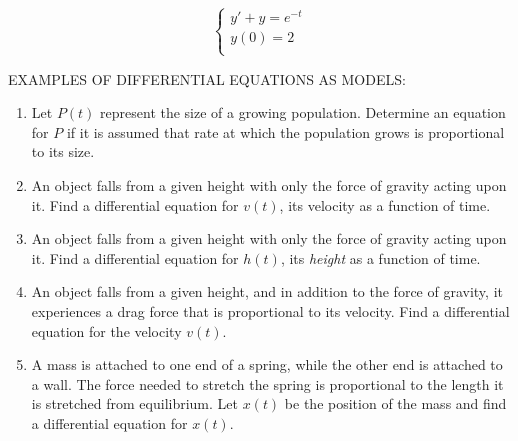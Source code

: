 \documentclass[11pt]{article}
\begin{document}
\begin{displaymath}
  \left\{ \begin{array}{ll}
  y' + y = e^{-t} \\
y(0) = 2 \\
\end{array} \right.
\end{displaymath}

\vspace{2in}

EXAMPLES OF DIFFERENTIAL EQUATIONS AS MODELS:\\

\begin{enumerate}
\item{Let $P(t)$ represent the size of a growing population.  Determine an equation for $P$ if it is assumed that rate
  at which the population grows is proportional to its size.}

\pagebreak

\item{An object falls from a given height with only the force of gravity acting upon it.  Find a differential equation
for $v(t)$, its velocity as a function of time.}

  \vspace{2in}

\item{An object falls from a given height with only the force of gravity acting upon it.  Find a differential equation
for $h(t)$, its \emph{height} as a function of time.}

  \vspace{2.5in}

\item{An object falls from a given height, and in addition to the force of gravity, it experiences a drag force
that is proportional to its velocity.  Find a differential equation for the velocity $v(t)$.}

\pagebreak
  
  \vspace{2in}
\item{A mass is attached to one end of a spring, while the other end is attached to a wall.  The force needed to stretch
  the spring is proportional to the length it is stretched from equilibrium.  Let $x(t)$ be the position of the mass and
find a differential equation for $x(t)$.}
  
  

\end{enumerate}


\pagebreak
\end{document}
